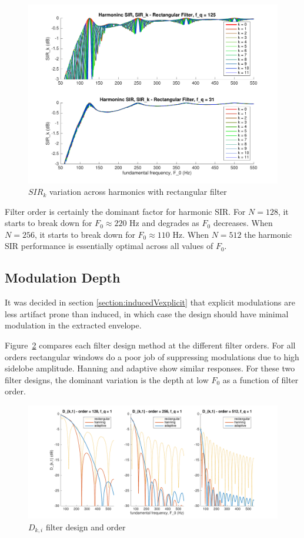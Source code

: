 \documentclass [11pt, proquest,oneside] {ganter_thesis}[2015/03/03]
\begin{document}
\begin{figure}[!ht]
  \centering
    \includegraphics[width=.7\textwidth]{sir_k_4}   
    \caption{$SIR_k$ variation across harmonics with rectangular filter}\label{fig:sir_k_4}
\end{figure}

Filter order is certainly the dominant factor for harmonic SIR.  For $N = 128$, it starts to break down for $F_0 \approx 220$ Hz and degrades as $F_0$ decreases.  When $N = 256$, it starts to break down for $F_0 \approx 110$ Hz.  When $N = 512$ the harmonic SIR performance is essentially optimal across all values of $F_0$.

\clearpage

\subsection{Modulation Depth}

It was decided in section \ref{section:inducedVexplicit} that explicit modulations are less artifact prone than induced, in which case the design should have minimal modulation in the extracted envelope.

Figure~\ref{fig:d_ki_1} compares each filter design method at the different filter orders.  For all orders rectangular windows do a poor job of suppressing modulations due to high sidelobe amplitude.  Hanning and adaptive show similar responses.  For these two filter designs, the dominant variation is the depth at low $F_0$ as a function of filter order.

\begin{figure}[!ht]
  \centering
    \includegraphics[width=1\textwidth]{d_ki_1}   
    \caption{$D_{k,i}$ filter design and order}\label{fig:d_ki_1}
\end{figure}
\end{document}

